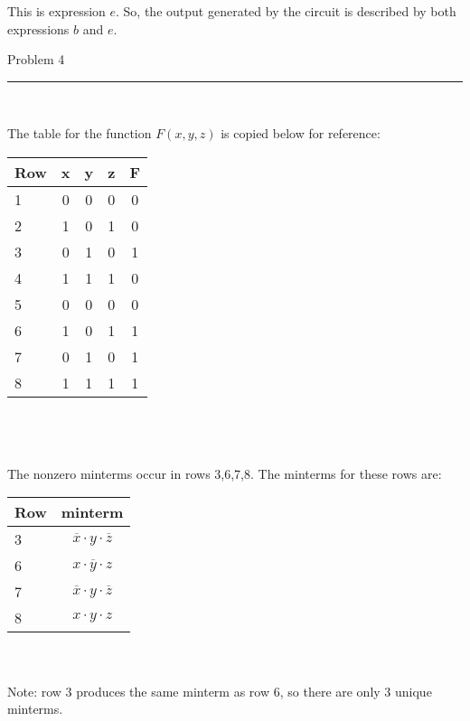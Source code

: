 \documentclass[11pt,reqno]{article}
\begin{document}
\noindent This is expression $e$. So, the output generated by the circuit is described by both expressions $b$ and $e$.
\newpage

\begin{flushleft} 
Problem 4 \\
\rule{500pt}{1pt}\\
\end{flushleft} 

\noindent The table for the function $F(x,y,z)$ is copied below for reference:\\

\begin{tabular}{| l | c | c | c | c |}
\hline
Row & x & y & z & F \\ \hline
1 & 0 & 0 & 0 & 0 \\ \hline
2 & 1 & 0 & 1 & 0 \\ \hline
3 & 0 & 1 & 0 & 1 \\ \hline
4 & 1 & 1 & 1 & 0 \\ \hline
5 & 0 & 0 & 0 & 0 \\ \hline
6 & 1 & 0 & 1 & 1 \\ \hline
7 & 0 & 1 & 0 & 1 \\ \hline
8 & 1 & 1 & 1 & 1 \\ \hline
\end{tabular}\\ \\

\noindent{}\\ 

\noindent The nonzero minterms occur in rows 3,6,7,8. The minterms for these rows are:\\

\begin{tabular}{| l | c |}
\hline
Row & minterm \\ \hline
3 & $\overline{x} \cdot y \cdot \overline{z}$ \\ \hline
6 & $x \cdot \overline y \cdot z$ \\ \hline
7 & $\overline{x} \cdot y \cdot \overline{z}$ \\ \hline
8 & $x \cdot y \cdot z$ \\ \hline
\end{tabular}\\ \\

\noindent Note: row 3 produces the same minterm as row 6, so there are only 3 unique minterms.\\
\end{document}

